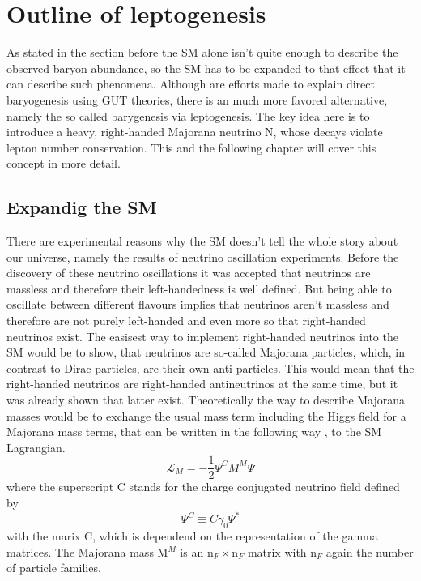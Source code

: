 \chapter{Outline of leptogenesis}
As stated in the section before the SM alone isn't quite enough to describe the observed baryon abundance, so the SM has to be expanded to that effect that it can describe such phenomena. \newline
Although are efforts made to explain direct baryogenesis using GUT theories, there is an much more favored alternative, namely the so called barygenesis via leptogenesis. The key idea here is to introduce a heavy, right-handed Majorana neutrino N, whose decays violate lepton number conservation. \newline
This and the following chapter will cover this concept in more detail.
\section{Expandig the SM}
There are experimental reasons why the SM doesn't tell the whole story about our universe, namely the results of neutrino oscillation experiments. Before the discovery of these neutrino oscillations it was accepted that neutrinos are massless and therefore their left-handedness is well defined. But being able to oscillate between different flavours implies that neutrinos aren't massless and therefore are not purely left-handed and even more so that right-handed neutrinos exist. The easisest way to implement right-handed neutrinos into the SM would be to show, that neutrinos are so-called Majorana particles, which, in contrast to Dirac particles, are their own anti-particles. This would mean that the right-handed neutrinos are right-handed antineutrinos at the same time, but it was already shown that latter exist. Theoretically the way to describe Majorana masses would be to exchange the usual mass term including the Higgs field for a Majorana mass terms, that can be written in the following way \cite[p. 18]{Taanila:2008}, to the SM Lagrangian.
\begin{equation*}
	\mathcal{L}_M=-\frac{1}{2}\overline{\Psi^C}M^M\Psi
	\label{eq:majorana}
\end{equation*}
where the superscript C stands for the charge conjugated neutrino field defined by
\begin{equation*}
	\Psi^C\equiv C\gamma_0\Psi^*
\end{equation*}
with the marix C, which is dependend on the representation of the gamma matrices. The Majorana mass M$^M$ is an n$_F\times$n$_F$ matrix with n$_F$ again the number of particle families. \newline
